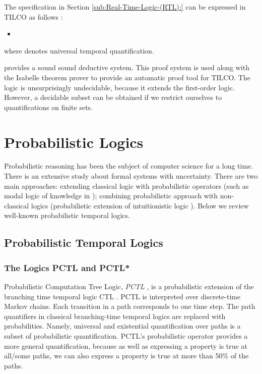 \documentclass[11pt]{article}
\begin{document}
The specification in Section \ref{sub:Real-Time-Logic-(RTL):} can be expressed in TILCO as follows \cite{BMN00}:

\begin{itemize}
\item   
\end{itemize}

\noindent where  denotes universal temporal quantification.

 \cite{Mat96,MN00} provides a sound sound deductive system. This proof system is used along with the Isabelle theorem prover  \cite{Pau94} to provide an automatic proof tool for TILCO. The logic is unsurprisingly undecidable, because it extends the first-order logic. However, a decidable subset can be obtained if we restrict ourselves to quantifications on finite sets.
 
\section{Probabilistic Logics}

Probabilistic reasoning has been the subject of computer science for a long time. There is an extensive study about formal systems with uncertainty. There are two main approaches: extending classical logic with probabilistic operators (such as modal logic of knowledge in \cite{FH94}); combining probabilistic approach with non-classical logics (probabilistic extension of intuitionistic logic \cite{MOR03}). Below we review well-known probabilistic temporal logics.
 
\subsection{Probabilistic Temporal Logics}

\subsubsection{The Logics PCTL and PCTL*}

Probabilistic Computation Tree Logic, \emph{PCTL} \cite{HJ89,HJ94}, is a probabilistic extension of the branching time temporal logic CTL \cite{CES86}. PCTL is interpreted over discrete-time Markov chains. Each transition in a path corresponds to one time step. The path quantifiers in classical branching-time temporal logics are replaced with probabilities. Namely, universal and existential quantification over paths is a subset of probabilistic quantification. PCTL's probabilistic operator provides a more general quantification, because as well as expressing a property is true at all/some paths, we can also express a property is true at more than 50\% of the paths. 
\end{document}
